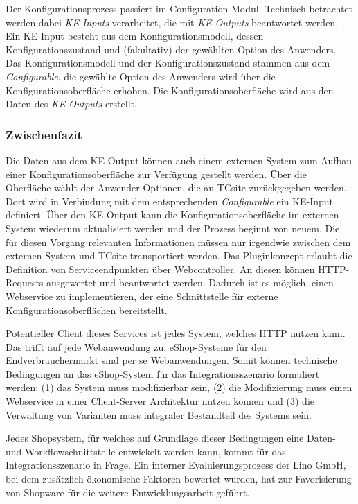 \documentclass[11pt, a4paper, titlepage, listof=totoc, bibliography=totoc, index=totoc, twoside, openright, headings=normal]{scrreprt}
\begin{document}
Der Konfigurationsprozess passiert im Configuration-Modul. Technisch betrachtet werden dabei \emph{KE-Inputs} verarbeitet, die mit \emph{KE-Outputs} beantwortet werden. Ein KE-Input besteht aus dem Konfigurationsmodell, dessen Konfigurationszustand und (fakultativ) der gewählten Option des Anwenders. Das Konfigurationsmodell und der Konfigurationszustand stammen aus dem \emph{Configurable}, die gewählte Option des Anwenders wird über die Konfigurationsoberfläche erhoben. Die Konfigurationsoberfläche wird aus den Daten des \emph{KE-Outputs} erstellt.

\subsubsection{Zwischenfazit}
\label{subsubsection:tcsiteFazit}

Die Daten aus dem KE-Output können auch einem externen System zum Aufbau einer Konfigurationsoberfläche zur Verfügung gestellt werden. Über die Oberfläche wählt der Anwender Optionen, die an TCsite zurückgegeben werden. Dort wird in Verbindung mit dem entsprechenden \emph{Configurable} ein KE-Input definiert. Über den KE-Output kann die Konfigurationsoberfläche im externen System wiederum aktualisiert werden und der Prozess beginnt von neuem. Die für diesen Vorgang relevanten Informationen müssen nur irgendwie zwischen dem externen System und TCsite transportiert werden. Das Pluginkonzept erlaubt die Definition von Serviceendpunkten über Webcontroller. An diesen können HTTP-Requests ausgewertet und beantwortet werden. Dadurch ist es möglich, einen Webservice zu implementieren, der eine Schnittstelle für externe Konfigurationsoberflächen bereitstellt.

Potentieller Client dieses Services ist jedes System, welches HTTP nutzen kann. Das trifft auf jede Webanwendung zu. eShop-Systeme für den Endverbrauchermarkt sind per se Webanwendungen. Somit können technische Bedingungen an das eShop-System für das Integrationsszenario formuliert werden: (1) das System muss modifizierbar sein, (2) die Modifizierung muss einen Webservice in einer Client-Server Architektur nutzen können und (3) die Verwaltung von Varianten muss integraler Bestandteil des Systems sein.

Jedes Shopsystem, für welches auf Grundlage dieser Bedingungen eine Daten- und Workflowschnittstelle entwickelt werden kann, kommt für das Integrationsszenario in Frage. Ein interner Evaluierungsprozess der Lino GmbH, bei dem zusätzlich ökonomische Faktoren bewertet wurden, hat zur Favorisierung von Shopware für die weitere Entwicklungsarbeit geführt.
\end{document}
